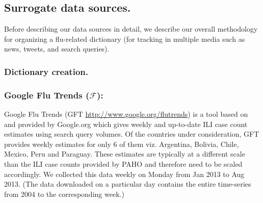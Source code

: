 

\subsection{Surrogate data sources.} Before
describing our data sources in detail, we describe our overall methodology
for organizing a flu-related dictionary (for tracking in multiple media such
as news, tweets, and search queries).

\subsubsection{\label{sec:keyword} Dictionary creation.} 

\subsubsection{Google Flu Trends ($\mathcal{F}$):}
Google Flu Trends (GFT \url{http://www.google.org/flutrends}) is a tool based
on~\cite{ginsberg2008detecting} and provided by Google.org which gives weekly
and up-to-date ILI case count estimates using search query volumes. 
Of the countries under
consideration, GFT provides weekly estimates for only 6 of them viz.  Argentina,
Bolivia, Chile, Mexico, Peru and Paraguay. 
These estimates are typically at
a different scale than the ILI case counts provided by PAHO and therefore need
to be scaled accordingly.  We collected this data weekly on Monday from Jan
2013 to Aug 2013. (The data downloaded on a particular day contains the entire
time-series from 2004 to the corresponding week.)
 
